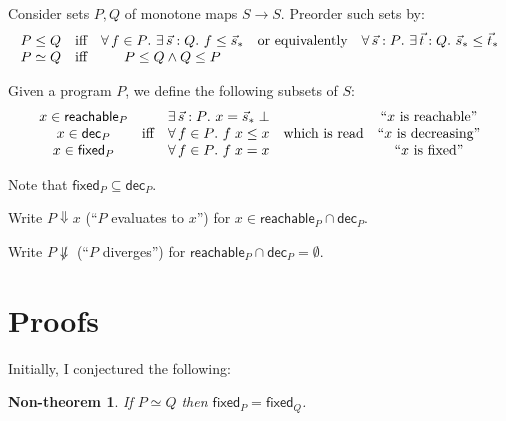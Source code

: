 \documentclass{article}
\newcommand{\fa}[1]{\forall\,{#1}.\ }
\newcommand{\te}[1]{\exists\,{#1}.\ }
\newcommand{\ms}[1]{\ensuremath{\textsf{#1}}}
\newcommand{\todo}[1]{{\color{red}{#1}}}
\newtheorem{nontheorem}{Non-theorem}
\begin{document}
Consider sets $P,Q$ of monotone maps $S \to S$. Preorder such sets by:
\[
\begin{array}{ccccc}
P \le Q
&\text{iff}& \fa{f \in P} \te{\vec{s} : Q} f \le \seq{s}
&\text{or equivalently}& \fa{\vec{s} : P} \te{\vec{t} : Q}
{\seq{s} \le \seq{t}}\\
P \simeq Q &\text{iff}& P \le Q \wedge Q \le P
\end{array}
\]

\todo{Could I instead (or additionally) consider sets closed under composition
  and identity? Hm...}

\newcommand{\pt}[2]{\ensuremath{\ms{{#1}}_{#2}}}

\newcommand{\dec}{\pt{dec}}
\newcommand{\inc}{\pt{inc}}
\newcommand{\fixed}{\pt{fixed}}
\newcommand{\reach}{\pt{reachable}}
\newcommand*{\defeq}{\stackrel{\text{def}}{=}}

Given a program $P$, we define the following subsets of $S$:
\[
\begin{array}{ccccc}
  x \in \reach{P}
  &\multirow{3}{*}{\text{iff}}& \te{\vec{s} : P} x = \seq{s}\;\bot
  &\multirow{3}{*}{which is read}&\text{``$x$ is reachable''}\\
  x \in \dec{P} && \fa{f \in P}{f\;x \le x} && \text{``$x$ is decreasing''}\\
  x \in \fixed{P} && \fa{f \in P}{f\;x = x} && \text{``$x$ is fixed''}
\end{array}
\]


Note that $\fixed{P} \subseteq \dec{P}$.

\newcommand{\eval}{\Downarrow}
\newcommand{\diverge}{\not\eval}

Write $P \eval x$ (``$P$ evaluates to $x$'') for $x \in \reach{P} \cap \dec{P}$.

Write $P \diverge$ (``$P$ diverges'') for $\reach{P} \cap \dec{P} = \emptyset$.


\section{Proofs}

Initially, I conjectured the following:

\begin{nontheorem}
  If $P \simeq Q$ then $\fixed{P} = \fixed{Q}$.
\end{nontheorem}
\end{document}
